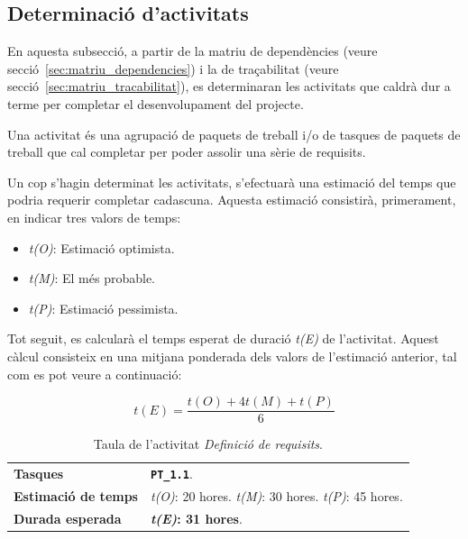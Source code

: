 \documentclass[a4paper,12pt]{ThesisStyle}
\begin{document}
\subsection{Determinació d'activitats}
\label{subsec:determinacio_activitats}

En aquesta subsecció, a partir de la matriu de dependències (veure secció~\ref{sec:matriu_dependencies}) i la de traçabilitat (veure secció~\ref{sec:matriu_tracabilitat}), es determinaran les activitats que caldrà dur a terme per completar el desenvolupament del projecte.

Una activitat és una agrupació de paquets de treball i/o de tasques de paquets de treball que cal completar per poder assolir una sèrie de requisits.

Un cop s'hagin determinat les activitats, s'efectuarà una estimació del temps que podria requerir completar cadascuna. Aquesta estimació consistirà, primerament, en indicar tres valors de temps:

\begin{itemize}
  \item \textit{t(O)}: Estimació optimista.
  \item \textit{t(M)}: El més probable.
  \item \textit{t(P)}: Estimació pessimista.
\end{itemize}

Tot seguit, es calcularà el temps esperat de duració \textit{t(E)} de l'activitat. Aquest càlcul consisteix en una mitjana ponderada dels valors de l'estimació anterior, tal com es pot veure a continuació:

\begin{equation}
  t(E) = \frac{t(O) + 4t(M) + t(P)}{6}
\end{equation}

\begin{table}[H]
  \begin{tabularx}{\textwidth}{l | X}
    \toprule
    \rowcolor{Gray}
    \multicolumn{2}{c}{\texttt{\textbf{A1:}} Definició de requisits}\\
    \midrule[0.9pt]
    \textbf{Tasques}                 & \texttt{\textbf{PT\_1.1}}.\\
    \midrule
    \textbf{Estimació de temps}      & \textit{t(O)}: 20 hores.
    \newline \textit{t(M)}: 30 hores.
    \newline \textit{t(P)}: 45 hores.\\
    \midrule
    \textbf{Durada esperada}         & \textbf{\textit{t(E)}: 31 hores}.\\
    \bottomrule
  \end{tabularx}
  \caption{\label{taula:a1} Taula de l'activitat \emph{Definició de requisits}.}
\end{table}
\end{document}
